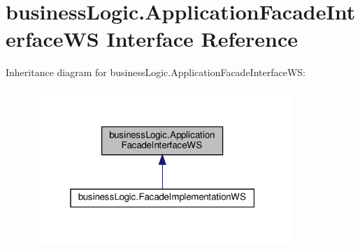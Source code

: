 \hypertarget{interfacebusiness_logic_1_1_application_facade_interface_w_s}{}\section{business\+Logic.\+Application\+Facade\+Interface\+WS Interface Reference}
\label{interfacebusiness_logic_1_1_application_facade_interface_w_s}


Inheritance diagram for business\+Logic.\+Application\+Facade\+Interface\+WS\+:
\nopagebreak
\begin{figure}[H]
\begin{center}
\leavevmode
\includegraphics[width=277pt]{interfacebusiness_logic_1_1_application_facade_interface_w_s__inherit__graph}
\end{center}
\end{figure}
